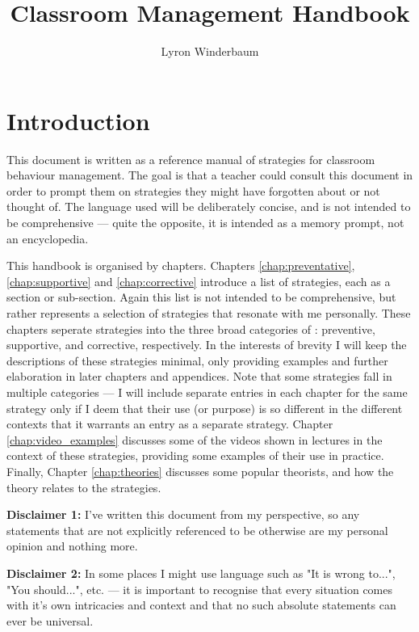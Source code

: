 \documentclass[12pt]{report}
\title{Classroom Management Handbook}
\author{Lyron Winderbaum}
\begin{document}
\maketitle

\tableofcontents

\chapter{Introduction}

This document is written as a reference manual of strategies for classroom behaviour management. The goal is that a teacher could consult this document in order to prompt them on strategies they might have forgotten about or not thought of. The language used will be deliberately concise, and is not intended to be comprehensive --- quite the opposite, it is intended as a memory prompt, not an encyclopedia.

This handbook is organised by chapters. Chapters \ref{chap:preventative}, \ref{chap:supportive} and \ref{chap:corrective} introduce a list of strategies, each as a section or sub-section.
Again this list is not intended to be comprehensive, but rather represents a selection of strategies that resonate with me personally. These chapters seperate strategies into the three broad categories of \cite{Charles2002}: preventive, supportive, and corrective, respectively. In the interests of brevity I will keep the descriptions of these strategies minimal, only providing examples and further elaboration in later chapters and appendices. Note that some strategies fall in multiple categories --- I will include separate entries in each chapter for the same strategy only if I deem that their use (or purpose) is so different in the different contexts that it warrants an entry as a separate strategy. Chapter \ref{chap:video_examples} discusses some of the videos shown in lectures in the context of these strategies, providing some examples of their use in practice. Finally, Chapter \ref{chap:theories} discusses some popular theorists, and how the theory relates to the strategies.

\textbf{Disclaimer 1:} I've written this document from my perspective, so any statements that are not explicitly referenced to be otherwise are my personal opinion and nothing more.

\textbf{Disclaimer 2:} In some places I might use language such as "It is wrong to...", "You should...", etc. --- it is important to recognise that every situation comes with it's own intricacies and context and that no such absolute statements can ever be universal.
\end{document}
